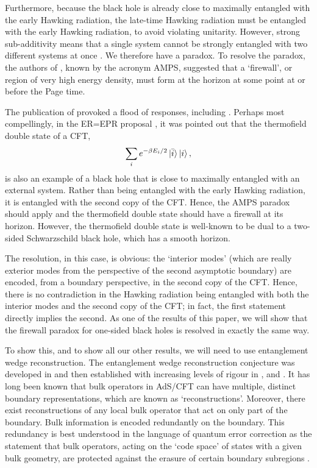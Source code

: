 \documentclass[12pt]{article}
\begin{document}
Furthermore, because the black hole is already close to maximally entangled with the early Hawking radiation, the late-time Hawking radiation must be entangled with the early Hawking radiation, to avoid violating unitarity. However, strong sub-additivity means that a single system cannot be strongly entangled with two different systems at once \cite{lieb1973proof}. We therefore have a paradox. To resolve the paradox, the authors of \cite{almheiri2013black}, known by the acronym AMPS, suggested that a `firewall', or region of very high energy density, must form at the horizon at some point at or before the Page time.

The publication of \cite{almheiri2013black} provoked a flood of responses, including \cite{nomura2013complementarity, bousso2013complementarity, susskind2012singularities, verlinde2013black, susskind2012transfer, harlow2013quantum}. Perhaps most compellingly, in the ER=EPR proposal \cite{maldacena2013cool}, it was pointed out that the thermofield double state of a CFT,
\begin{align}
\sum_i e^{- \beta E_i / 2} \ket{\bar{i}} \ket{i},
\end{align}
is also an example of a black hole that is close to maximally entangled with an external system. Rather than being entangled with the early Hawking radiation, it is entangled with the second copy of the CFT. Hence, the AMPS paradox should apply and the thermofield double state should have a firewall at its horizon. However, the thermofield double state is well-known to be dual to a two-sided Schwarzschild black hole, which has a smooth horizon. 

The resolution, in this case, is obvious: the `interior modes' (which are really exterior modes from the perspective of the second asymptotic boundary) are encoded, from a boundary perspective, in the second copy of the CFT. Hence, there is no contradiction in the Hawking radiation being entangled with both the interior modes and the second copy of the CFT; in fact, the first statement directly implies the second. As one of the results of this paper, we will show that the firewall paradox for one-sided black holes is resolved in exactly the same way. 

To show this, and to show all our other results, we will need to use entanglement wedge reconstruction. The entanglement wedge reconstruction conjecture was developed in \cite{czech2012gravity, headrick2014causality, wall2014maximin} and then established with increasing levels of rigour in \cite{jafferis2016relative}, \cite{dong2016reconstruction} and \cite{cotler2017entanglement}. It has long been known that bulk operators in AdS/CFT can have multiple, distinct boundary representations, which are known as `reconstructions'. Moreover, there exist reconstructions of any local bulk operator that act on only part of the boundary. Bulk information  is encoded redundantly on the boundary. This redundancy is best understood in the language of quantum error correction as the statement that bulk operators, acting on the `code space' of states with a given bulk geometry, are protected against the erasure of certain boundary subregions \cite{almheiri2015bulk}. 
\end{document}

